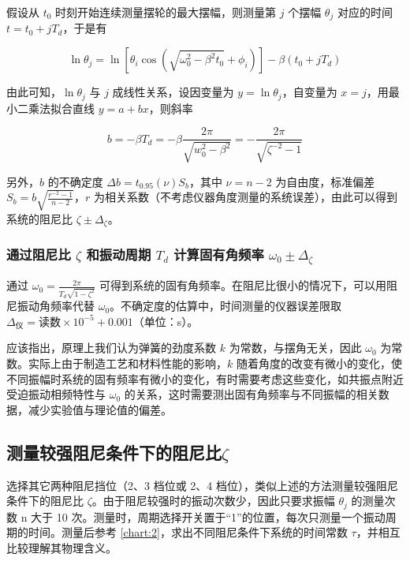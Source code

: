 \documentclass[12pt,a4paper]{amsart}
\begin{document}
假设从 $t_0$ 时刻开始连续测量摆轮的最大摆幅，则测量第 $j$ 个摆幅 $\theta_j$ 对应的时间 $t=t_0+jT_d$，于是有

\begin{equation}
	\ln\theta_j = \ln[\theta_i\cos(\sqrt{\omega_0^2-\beta^2 t_0}+\phi_i)] - \beta(t_0+jT_d) \label{eq:15}
\end{equation}

由此可知，$\ln\theta_j$ 与 $j$ 成线性关系，设因变量为 $y=\ln\theta_j$，自变量为 $x=j$，用最小二乘法拟合直线 $y=a+bx$，则斜率

\begin{equation}
	b = -\beta T_d = -\beta\frac{2\pi}{\sqrt{w_0^2-\beta^2}} = -\frac{2\pi}{\sqrt{\zeta^{-2}-1}} \label{eq:16}
\end{equation}

另外，$b$ 的不确定度 $\Delta b = t_{0.95}(\nu)S_b$，其中 $\nu=n-2$ 为自由度，标准偏差 $S_b = b\sqrt{\frac{r^{-2}-1}{n-2}}$，$r$ 为相关系数（不考虑仪器角度测量的系统误差），由此可以得到系统的阻尼比 $\zeta \pm \Delta_\zeta$。

\subsubsection{通过阻尼比 $\zeta$ 和振动周期 $T_d$ 计算固有角频率 $\omega_0\pm\Delta_\zeta$}

通过 $\omega_0 = \frac{2\pi}{T_d\sqrt{1-\zeta^2}}$ 可得到系统的固有角频率。在阻尼比很小的情况下，可以用阻尼振动角频率代替 $\omega_0$。不确定度的估算中，时间测量的仪器误差限取 $\Delta_\text{仪} = \text{读数} \times 10^{-5} + 0.001$（单位：s）。

应该指出，原理上我们认为弹簧的劲度系数 $k$ 为常数，与摆角无关，因此 $\omega_0$ 为常数。实际上由于制造工艺和材料性能的影响，$k$ 随着角度的改变有微小的变化，使不同振幅时系统的固有频率有微小的变化，有时需要考虑这些变化，如共振点附近受迫振动相频特性与 $\omega_0$ 的关系，这时需要测出固有角频率与不同振幅的相关数据，减少实验值与理论值的偏差。

\subsection{测量较强阻尼条件下的阻尼比$\zeta$}

选择其它两种阻尼挡位（2、3 档位或 2、4 档位），类似上述的方法测量较强阻尼条件下的阻尼比 $\zeta$。由于阻尼较强时的振动次数少，因此只要求振幅 $\theta_j$ 的测量次数 n 大于 10 次。测量时，周期选择开关置于“1”的位置，每次只测量一个振动周期的时间。测量后参考 \ref{chart:2}，求出不同阻尼条件下系统的时间常数 $\tau$，并相互比较理解其物理含义。
\end{document}
